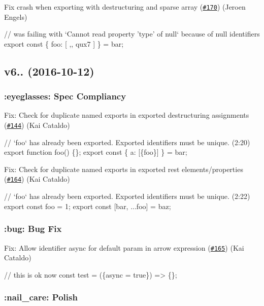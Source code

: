 Fix crash when exporting with destructuring and sparse array (\href{https://github.com/babel/babylon/pull/170}{\tt \#170}) (Jeroen Engels)


\begin{DoxyCode}
// was failing with `Cannot read property 'type' of null` because of null identifiers
export const \{ foo: [ ,, qux7 ] \} = bar;
\end{DoxyCode}


\subsection*{v6.. (2016-\/10-\/12)}

\subsubsection*{\+:eyeglasses\+: Spec Compliancy}

Fix\+: Check for duplicate named exports in exported destructuring assignments (\href{https://github.com/babel/babylon/pull/144}{\tt \#144}) (Kai Cataldo)


\begin{DoxyCode}
// `foo` has already been exported. Exported identifiers must be unique. (2:20)
export function foo() \{\};
export const \{ a: [\{foo\}] \} = bar;
\end{DoxyCode}


Fix\+: Check for duplicate named exports in exported rest elements/properties (\href{https://github.com/babel/babylon/pull/164}{\tt \#164}) (Kai Cataldo)


\begin{DoxyCode}
// `foo` has already been exported. Exported identifiers must be unique. (2:22)
export const foo = 1;
export const [bar, ...foo] = baz;
\end{DoxyCode}


\subsubsection*{\+:bug\+: Bug Fix}

Fix\+: Allow identifier {\ttfamily async} for default param in arrow expression (\href{https://github.com/babel/babylon/pull/165}{\tt \#165}) (Kai Cataldo)


\begin{DoxyCode}
// this is ok now
const test = (\{async = true\}) => \{\};
\end{DoxyCode}


\subsubsection*{\+:nail\+\_\+care\+: Polish}

